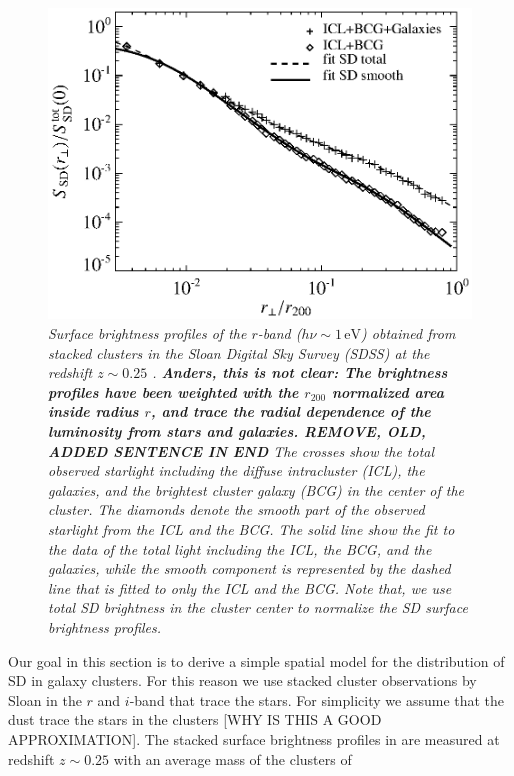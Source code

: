 \documentclass[10pt,aps,pra,reprint,amsmath,amsfonts,amssymb,showpacs,nofootinbib,floatfix]{revtex4-1}
\newcommand{\rmn}{\mathrm}
\newcommand{\ev}{\rmn{eV}}
\newcommand{\rvir}{r_{200}}
\begin{document}
\begin{figure}%
 \includegraphics[width=0.99\columnwidth]{figures/SB.photon.eps}
 \caption{\it Surface brightness profiles of the $r$-band ($h\nu\sim
   1\,\ev$) obtained from stacked clusters in the Sloan Digital Sky
   Survey (SDSS) at the redshift $z \sim 0.25$
   \cite{2005MNRAS.358..949Z}. {\bf Anders, this is not clear: The
     brightness profiles have been weighted with the $\rvir$
     normalized area inside radius $r$, and trace the radial
     dependence of the luminosity from stars and galaxies. REMOVE,
     OLD, ADDED SENTENCE IN END} The crosses show the total observed
   starlight including the diffuse intracluster (ICL), the galaxies,
   and the brightest cluster galaxy (BCG) in the center of the
   cluster. The diamonds denote the smooth part of the observed
   starlight from the ICL and the BCG. The solid line show the fit to
   the data of the total light including the ICL, the BCG, and the
   galaxies, while the smooth component is represented by the dashed
   line that is fitted to only the ICL and the BCG. Note that, we use
   total SD brightness in the cluster center to normalize the SD
   surface brightness profiles.}
 \label{fig:SD_spatial}
\end{figure}
Our goal in this section is to derive a simple spatial model for the
distribution of SD in galaxy clusters. For this reason we use stacked
cluster observations by Sloan in the $r$ and $i$-band that trace the
stars. For simplicity we assume that the dust trace the stars in the
clusters [WHY IS THIS A GOOD APPROXIMATION]. The stacked surface
brightness profiles in \cite{2005MNRAS.358..949Z} are measured at
redshift $z \sim 0.25$ with an average mass of the clusters of
\end{document}
